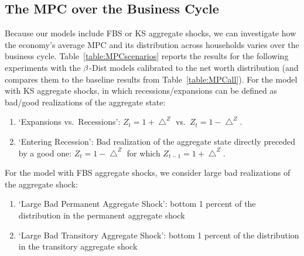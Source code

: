 \documentclass[12pt,titlepage]{econtex}
\renewcommand{\ptyLev}{\ensuremath{Z}} %
\begin{document}
\subsection{The MPC over the Business Cycle} \label{ss:BusinessCycle}

Because our models include FBS or KS aggregate shocks, we can investigate how the economy's
average MPC and its distribution across households varies over the business cycle. Table~\ref{table:MPCscenarios} reports
the results for the following experiments with the $\beta$-Dist models calibrated to the net worth distribution (and compares them to the baseline results from Table~\ref{table:MPCall}). For the model with KS aggregate shocks, in which recessions/expansions can be defined as bad/good realizations of the aggregate state:
\begin{enumerate}
\item `Expansions vs.\ Recessions': $\ptyLev_{t}=1+\bigtriangleup ^{\ptyLev}$ vs.\ $\ptyLev_{t}=1-\bigtriangleup ^{\ptyLev}$.
\item `Entering Recession': Bad realization of the aggregate state directly preceded by a good one: $\ptyLev_{t}=1-\bigtriangleup ^{\ptyLev}$ for which $\ptyLev_{t-1}=1+\bigtriangleup ^{\ptyLev}$.
\end{enumerate}
For the model with FBS aggregate shocks, we consider large bad realizations of the aggregate shock:
\begin{enumerate}
\item `Large Bad Permanent Aggregate Shock': bottom 1 percent of the distribution in the permanent aggregate shock
\item `Large Bad Transitory Aggregate Shock': bottom 1 percent of the distribution in the transitory aggregate shock
\end{enumerate}
\end{document}
